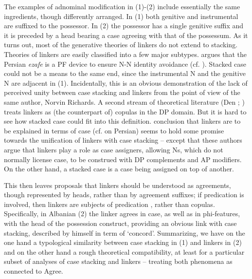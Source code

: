 \documentclass[output=paper]{langsci/langscibook}
\begin{document}
The examples of adnominal modification in (1)-(2) include essentially the same ingredients, though differently arranged. In (1) both genitive and instrumental are suffixed to the possessor. In (2) the possessor has a single genitive suffix and it is preceded by a head bearing a case agreeing with that of the possessum. As it turns out, most of the generative theories of linkers do not extend to stacking. Theories of linkers are easily classified into a few major subtypes. \citet{Richards2010} argues that the Persian \textit{ezafe} is a PF device to ensure N-N identity avoidance (cf. \citealt{Ghomeshi1997}). Stacked case could not be a means to the same end, since the instrumental N and the genitive N are adjacent in (1). Incidentally, this is an obvious demonstration of the lack of perceived unity between case stacking and linkers from the point of view of the same author, Norvin Richards. A second stream of theoretical literature (Den \citealt{Dikken2004}; \citealt{Campos2005}) treats linkers as (the counterpart of) copulas in the DP domain. But it is hard to see how stacked case could fit into this definition.  conclusion that linkers are to be explained in terms of case (cf. \citealt{Samiian1994} on Persian) seems to hold some promise towards the unification of linkers with case stacking – except that these authors argue that linkers play a role as case assigners, allowing Ns, which do not normally license case, to be construed with DP complements and AP modifiers. On the other hand, a stacked case is a case being assigned on top of another. 

This then leaves proposals \citep{Philip2012} that linkers should be understood as agreements, though represented by heads, rather than by agreement suffixes; if predication is involved, then linkers are subjects of predication \citep{FrancoEtAl2015}, rather than copulas. Specifically, in Albanian (2) the linker agrees in case, as well as in phi-features, with the head of the possession construct, providing an obvious link with case stacking, described by \citet{Richards2013} himself in term of ‘concord’. Summarizing, we have on the one hand a typological similarity between case stacking in (1) and linkers in (2) and on the other hand a rough theoretical compatibility, at least for a particular subset of analyses of case stacking and linkers – treating both phenomena as connected to Agree. 
\end{document}
